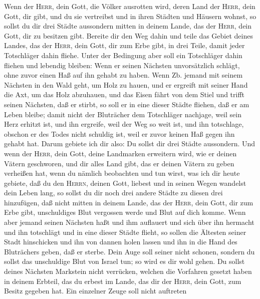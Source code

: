  Wenn der \textsc{Herr}, dein Gott, die Völker ausrotten
wird, deren Land der \textsc{Herr}, dein Gott, dir gibt, und du sie
vertreibst und in ihren Städten und Häusern wohnst,  so
sollst du dir drei Städte aussondern mitten in deinem Lande, das der
\textsc{Herr}, dein Gott, dir zu besitzen gibt.  Bereite
dir den Weg dahin und teile das Gebiet deines Landes, das der
\textsc{Herr}, dein Gott, dir zum Erbe gibt, in drei Teile, damit jeder
Totschläger dahin fliehe.  Unter der Bedingung aber soll
ein Totschläger dahin fliehen und lebendig bleiben: Wenn er seinen
Nächsten unvorsätzlich schlägt, ohne zuvor einen Haß auf ihn gehabt zu
haben.  Wenn Zb. jemand mit seinem Nächsten in den Wald
geht, um Holz zu hauen, und er ergreift mit seiner Hand die Axt, um das
Holz abzuhauen, und das Eisen fährt von dem Stiel und trifft seinen
Nächsten, daß er stirbt, so soll er in eine dieser Städte fliehen, daß
er am Leben bleibe;  damit nicht der Bluträcher dem
Totschläger nachjage, weil sein Herz erhitzt ist, und ihn ergreife, weil
der Weg so weit ist, und ihn totschlage, obschon er des Todes nicht
schuldig ist, weil er zuvor keinen Haß gegen ihn gehabt hat.
 Darum gebiete ich dir also: Du sollst dir drei Städte
aussondern.  Und wenn der \textsc{Herr}, dein Gott, deine
Landmarken erweitern wird, wie er deinen Vätern geschworen, und dir
alles Land gibt, das er deinen Vätern zu geben verheißen hat,
 wenn du nämlich beobachten und tun wirst, was ich dir
heute gebiete, daß du den \textsc{Herrn}, deinen Gott, liebest und in
seinen Wegen wandelst dein Leben lang, so sollst du dir noch drei andere
Städte zu diesen drei hinzufügen,  daß nicht mitten in
deinem Lande, das der \textsc{Herr}, dein Gott, dir zum Erbe gibt,
unschuldiges Blut vergossen werde und Blut auf dich komme.
 Wenn aber jemand seinen Nächsten haßt und ihm auflauert
und sich über ihn hermacht und ihn totschlägt und in eine dieser Städte
flieht,  so sollen die Ältesten seiner Stadt hinschicken
und ihn von dannen holen lassen und ihn in die Hand des Bluträchers
geben, daß er sterbe.  Dein Auge soll seiner nicht
schonen, sondern du sollst das unschuldige Blut von Israel tun; so wird
es dir wohl gehen.  Du sollst deines Nächsten Markstein
nicht verrücken, welchen die Vorfahren gesetzt haben in deinem Erbteil,
das du erbest im Lande, das dir der \textsc{Herr}, dein Gott, zum Besitz
gegeben hat.  Ein einzelner Zeuge soll nicht auftreten
